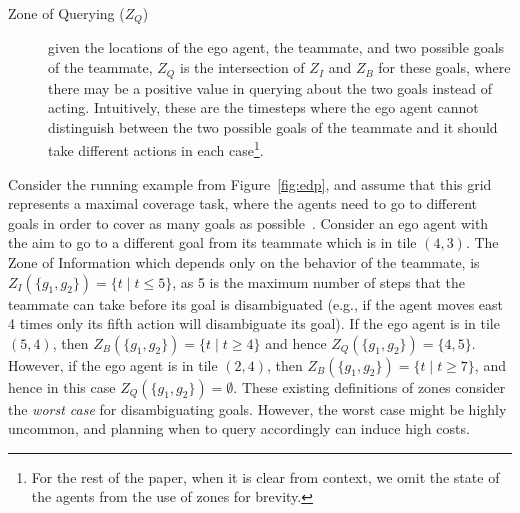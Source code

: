 \documentclass[letterpaper]{article}
\begin{document}
\begin{description}
\item [Zone of Querying ($Z_Q$)] given the locations of the ego agent, the teammate, and two possible goals of the teammate, $Z_Q$ is the intersection of $Z_I$ and $Z_B$ for these goals, where there may be a positive value in querying about the two goals instead of acting. Intuitively, these are the timesteps where the ego agent cannot distinguish between the two possible goals of the teammate and it should take different actions in each case\footnote{For the rest of the paper, when it is clear from context, we omit the state of the agents from the use of zones for brevity.}.
\end{description}

\noindent  Consider the running example from Figure~\ref{fig:edp}, and assume that this grid represents a maximal coverage task, where the agents need to go to different goals in order to cover as many goals as possible~\cite{pita2008deployed}. Consider an ego agent with the aim to go to a different goal from its teammate which is in tile $(4,3)$. The Zone of Information which depends only on the behavior of the teammate, is $Z_I(\{g_1,g_2\})=\{t \mid t \leq 5\}$, as 5 is the maximum number of steps that the teammate can take before its goal is disambiguated (e.g., if the agent moves east 4 times only its fifth action will disambiguate its goal). If the ego agent is in tile $(5,4)$, then $Z_B(\{g_1,g_2\})=\{t \mid t \geq 4\}$ and hence $Z_Q(\{g_1,g_2\})=\{4,5\}$. However, if the ego agent is in tile $(2,4)$, then $Z_B(\{g_1,g_2\})=\{t \mid t \geq 7\}$, and hence in this case $Z_Q(\{g_1,g_2\})=\emptyset$.
These existing definitions of zones consider the \emph{worst case} for disambiguating goals. However, the worst case might be highly uncommon, and planning when to query accordingly can induce high costs. 
\end{document}
